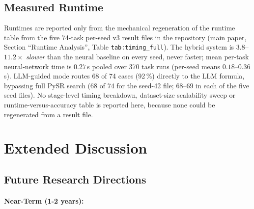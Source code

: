 \documentclass[twoside,11pt]{article}
\begin{document}
\subsection{Measured Runtime}

Runtimes are reported only from the mechanical regeneration of the runtime table from the
five 74-task per-seed v3 result files in the repository (main paper, Section ``Runtime
Analysis'', Table \texttt{tab:timing\_full}). The hybrid system is $3.8$--$11.2\times$
\emph{slower} than the neural baseline on every seed, never faster; mean per-task
neural-network time is $0.27$\,s pooled over 370 task runs (per-seed means
$0.18$--$0.36$\,s). LLM-guided mode routes 68 of 74 cases (92\,\%) directly to the LLM
formula, bypassing full PySR search (68 of 74 for the seed-42 file; $68$--$69$ in each of the
five seed files). No stage-level timing breakdown, dataset-size scalability sweep or
runtime-versus-accuracy table is reported here, because none could be regenerated from a
result file.






\section{Extended Discussion}
\label{app:extended_discussion}

\subsection{Future Research Directions}
\label{sec:future_work}

\paragraph{Near-Term (1-2 years):}
\end{document}
